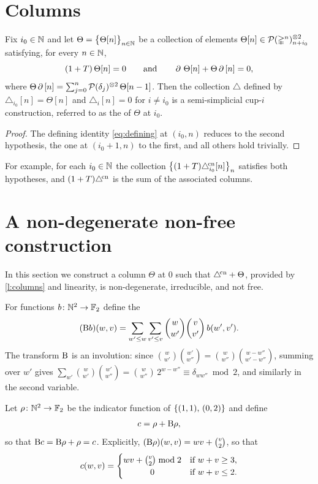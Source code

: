 \documentclass{amsart}
\begin{document}
\section{Columns}\label{s:columns}

\begin{lemma}\label{l:columns}
	Fix $i_0 \in \N$ and let $\Theta = \set[\big]{\Theta[n]}_{n\in\N}$ be a collection of elements $\Theta[n] \in \cP(\simplex^n)^{\ot 2}_{n + i_0}$ satisfying, for every $n \in \N$,
	\[
	(1+T)\,\Theta[n] = 0
	\qquad \text{and} \qquad
	\bd\, \Theta[n] + \Theta\bd\,[n] = 0,
	\]
	where $\Theta\bd\,[n] = \sum_{j=0}^{n} \cP(\delta_j)^{\ot 2}\, \Theta[n-1]$.
	Then the collection $\triangle$ defined by $\triangle_{i_0}[n] = \Theta[n]$ and $\triangle_{i}[n] = 0$ for $i \neq i_0$ is a semi-simplicial \mbox{cup-$i$} construction, referred to as the  of $\Theta$ at $i_0$.
\end{lemma}

\begin{proof}
	The defining identity \eqref{eq:defining} at $(i_0, n)$ reduces to the second hypothesis, the one at $(i_0+1, n)$ to the first, and all others hold trivially.
\end{proof}

For example, for each $i_0 \in \N$ the collection $\set[\big]{(1+T)\canonical_{i_0}[n]}_{n}$ satisfies both hypotheses, and $(1+T)\canonical$ is the sum of the associated columns.

\section{A non-degenerate non-free construction}\label{s:pascal}

In this section we construct a column $\Theta$ at $0$ such that $\canonical + \Theta$, provided by \cref{l:columns} and linearity, is non-degenerate, irreducible, and not free.

For functions $b \colon \N^2 \to \F$ define the 
\[
(\rB b)(w,v) = \sum_{w' \leq w} \sum_{v' \leq v} \binom{w}{w'} \binom{v}{v'}\, b(w',v').
\]
The transform $\rB$ is an involution: since $\binom{w}{w'}\binom{w'}{w''} = \binom{w}{w''}\binom{w - w''}{w' - w''}$, summing over $w'$ gives $\sum_{w'} \binom{w}{w'}\binom{w'}{w''} = \binom{w}{w''}\, 2^{w - w''} \equiv \delta_{w w''} \bmod 2$, and similarly in the second variable.

Let $\rho \colon \N^2 \to \F$ be the indicator function of $\set{(1,1),\, (0,2)}$ and define
\[
c = \rho + \rB\rho,
\]
so that $\rB c = \rB \rho + \rho = c$.
Explicitly, $(\rB\rho)(w,v) = wv + \binom{v}{2}$, so that
\[
c(w,v) =
\begin{cases}
	wv + \binom{v}{2} \bmod 2 & \text{if } w + v \geq 3, \\
	\hfil 0 & \text{if } w + v \leq 2.
\end{cases}
\]
\end{document}

